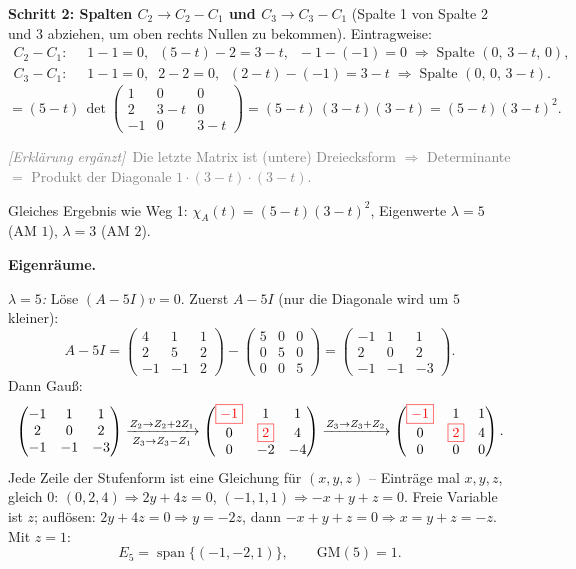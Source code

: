 \documentclass[a4paper,12pt]{article}
\newcommand{\piv}[1]{{\color{red}\boxed{#1}}}
\newcommand{\erglerk}{\textcolor{gray}{\small\textit{[Erkl\"arung erg\"anzt]}}}
\newcommand{\EW}{Eigenwert}
\begin{document}
\textbf{Schritt 2: Spalten $C_2 \to C_2 - C_1$ und $C_3 \to C_3 - C_1$} (Spalte 1 von Spalte 2 und 3 abziehen, um oben rechts Nullen zu bekommen). Eintragweise:
\begin{align*}
C_2 - C_1:\;\; & 1-1 = 0,\;\; (5-t)-2 = 3-t,\;\; -1-(-1) = 0 \;\Rightarrow\; \text{Spalte } (0,\, 3-t,\, 0), \\
C_3 - C_1:\;\; & 1-1 = 0,\;\; 2-2 = 0,\;\; (2-t)-(-1) = 3-t \;\Rightarrow\; \text{Spalte } (0,\, 0,\, 3-t).
\end{align*}
\[
= (5-t)\,\det\!\begin{pmatrix} 1 & 0 & 0 \\ 2 & 3-t & 0 \\ -1 & 0 & 3-t \end{pmatrix}
= (5-t)\,(3-t)(3-t) = (5-t)(3-t)^2.
\]

\erglerk\ \textcolor{gray}{\small Die letzte Matrix ist (untere) Dreiecksform $\Rightarrow$ Determinante $=$ Produkt der Diagonale $1\cdot(3-t)\cdot(3-t)$.}

Gleiches Ergebnis wie Weg 1: $\chi_A(t) = (5-t)(3-t)^2$, \EW{}e $\lambda = 5$ (AM $1$), $\lambda = 3$ (AM $2$).

\medskip
\textbf{Eigenr\"aume.}

\textit{$\lambda = 5$:} L\"ose $(A - 5I)v = 0$. Zuerst $A - 5I$ (nur die Diagonale wird um $5$ kleiner):
\[
A - 5I = \begin{pmatrix} 4 & 1 & 1 \\ 2 & 5 & 2 \\ -1 & -1 & 2 \end{pmatrix} - \begin{pmatrix} 5 & 0 & 0 \\ 0 & 5 & 0 \\ 0 & 0 & 5 \end{pmatrix} = \begin{pmatrix} -1 & 1 & 1 \\ 2 & 0 & 2 \\ -1 & -1 & -3 \end{pmatrix}.
\]
Dann Gau\ss:
\[
\begin{pmatrix} -1 & 1 & 1 \\ 2 & 0 & 2 \\ -1 & -1 & -3 \end{pmatrix}
\xrightarrow[Z_3 \to Z_3 - Z_1]{Z_2 \to Z_2 + 2Z_1}
\begin{pmatrix} \piv{-1} & 1 & 1 \\ 0 & \piv{2} & 4 \\ 0 & -2 & -4 \end{pmatrix}
\xrightarrow{Z_3 \to Z_3 + Z_2}
\begin{pmatrix} \piv{-1} & 1 & 1 \\ 0 & \piv{2} & 4 \\ 0 & 0 & 0 \end{pmatrix}.
\]
Jede Zeile der Stufenform ist eine Gleichung f\"ur $(x,y,z)$ -- Eintr\"age mal $x, y, z$, gleich $0$: \; $(0,2,4) \Rightarrow 2y + 4z = 0$, \quad $(-1,1,1) \Rightarrow -x + y + z = 0$. Freie Variable ist $z$; aufl\"osen: $2y + 4z = 0 \Rightarrow y = -2z$, dann $-x + y + z = 0 \Rightarrow x = y + z = -z$. Mit $z = 1$:
\[
E_5 = \operatorname{span}\{(-1, -2, 1)\}, \qquad \text{GM}(5) = 1.
\]
\end{document}
